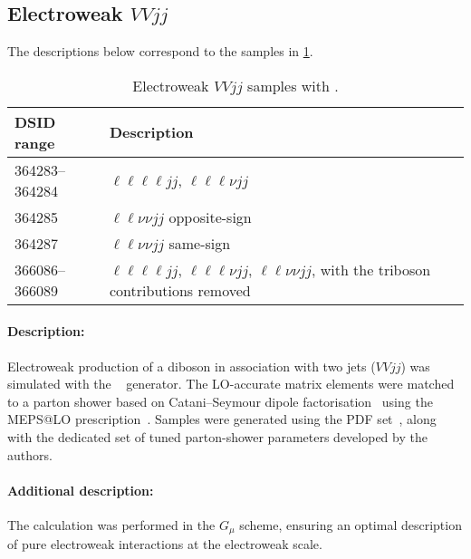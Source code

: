 


\subsection[Electroweak VVjj]{Electroweak \(VVjj\)}

The descriptions below correspond to the samples in
\cref{tab:MB-sherpa-vvjj}.

\begin{table}[htbp]
  \caption{Electroweak \(VVjj\) samples with \SHERPA.}%
  \label{tab:MB-sherpa-vvjj}
  \centering
  \begin{tabular}{l l}
    \toprule
    DSID range & Description \\
    \midrule
    364283--364284   & \(\ell\ell\ell\ell jj\), \(\ell\ell\ell\nu jj\)\\
    364285   &  \(\ell\ell\nu\nu jj\) opposite-sign\\
    364287   &  \(\ell\ell\nu\nu jj\) same-sign\\
    366086--366089   &  \(\ell\ell\ell\ell jj\), \(\ell\ell\ell\nu jj\), \(\ell\ell\nu\nu jj\), with the triboson contributions removed\\
    \bottomrule
  \end{tabular}
\end{table}

\paragraph{Description:}

Electroweak production of a diboson in association with two jets
(\(VVjj\)) was simulated with the \SHERPA[2.2.2]~\cite{Bothmann:2019yzt}
generator. The LO-accurate matrix elements were matched to a parton
shower based on Catani--Seymour dipole factorisation~\cite{Gleisberg:2008fv,Schumann:2007mg} using the MEPS@LO
prescription~\cite{Hoeche:2011fd,Hoeche:2012yf,Catani:2001cc,Hoeche:2009rj}.
Samples were generated using the \NNPDF[3.0nnlo] PDF set~\cite{Ball:2014uwa},
along with the dedicated set of tuned parton-shower parameters
developed by the \SHERPA authors.

\paragraph{Additional description:} The calculation was performed in the
\(G_\mu\) scheme, ensuring an optimal description of pure
electroweak interactions at the electroweak scale.

